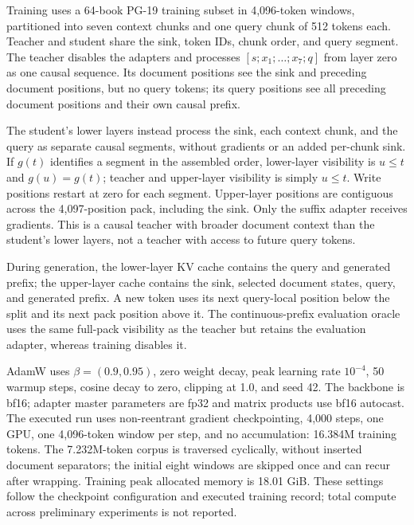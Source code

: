 Training uses a 64-book PG-19 training subset in 4,096-token windows, partitioned into seven context chunks and one query chunk of 512 tokens each. Teacher and student share the sink, token IDs, chunk order, and query segment. The teacher disables the adapters and processes $[s;x_1;\ldots;x_7;q]$ from layer zero as one causal sequence. Its document positions see the sink and preceding document positions, but no query tokens; its query positions see all preceding document positions and their own causal prefix.

The student's lower layers instead process the sink, each context chunk, and the query as separate causal segments, without gradients or an added per-chunk sink. If $g(t)$ identifies a segment in the assembled order, lower-layer visibility is $u\le t$ and $g(u)=g(t)$; teacher and upper-layer visibility is simply $u\le t$. Write positions restart at zero for each segment. Upper-layer positions are contiguous across the 4,097-position pack, including the sink. Only the suffix adapter receives gradients. This is a causal teacher with broader document context than the student's lower layers, not a teacher with access to future query tokens.

During generation, the lower-layer KV cache contains the query and generated prefix; the upper-layer cache contains the sink, selected document states, query, and generated prefix. A new token uses its next query-local position below the split and its next pack position above it. The continuous-prefix evaluation oracle uses the same full-pack visibility as the teacher but retains the evaluation adapter, whereas training disables it.

AdamW uses $\beta=(0.9,0.95)$, zero weight decay, peak learning rate $10^{-4}$, 50 warmup steps, cosine decay to zero, clipping at 1.0, and seed 42. The backbone is bf16; adapter master parameters are fp32 and matrix products use bf16 autocast. The executed run uses non-reentrant gradient checkpointing, 4,000 steps, one GPU, one 4,096-token window per step, and no accumulation: 16.384M training tokens. The 7.232M-token corpus is traversed cyclically, without inserted document separators; the initial eight windows are skipped once and can recur after wrapping. Training peak allocated memory is 18.01 GiB. These settings follow the checkpoint configuration and executed training record; total compute across preliminary experiments is not reported.

